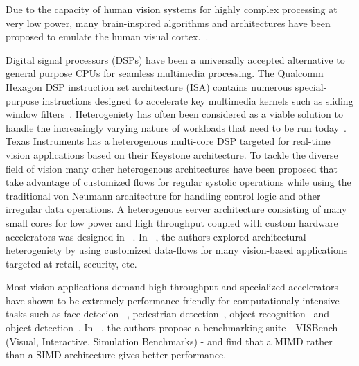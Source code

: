 
Due to the capacity of human vision systems for highly complex processing at very low power, many brain-inspired algorithms and architectures have been proposed to emulate the human visual cortex.~\cite{Nere2011,Chen2014,Kestur2012}. %

Digital signal processors (DSPs) have been a universally accepted alternative to general purpose CPUs for seamless multimedia processing. 
The Qualcomm Hexagon DSP instruction set architecture (ISA) contains numerous special-purpose instructions designed to accelerate key multimedia kernels such as 
sliding window filters~\cite{hexagon}. 
Heterogeniety has often been considered as a viable solution to handle the increasingly varying nature of workloads that need to be run today~\cite{micro2010}.
Texas Instruments has a heterogenous multi-core DSP targeted for real-time vision applications based on their Keystone architecture. 
To tackle the diverse field of vision many other heterogenous architectures have been proposed that take advantage of 
customized flows for regular systolic operations while
using the traditional von Neumann architecture for handling control logic and other irregular data operations. A heterogenous server architecture consisting of 
many small cores for low power and high throughput coupled with custom hardware accelerators was designed in ~\cite{Iyer2011}.
In ~\cite{HPCA2015}, the authors explored architectural heterogeniety by using customized data-flows for many vision-based applications targeted at retail, 
security, etc.

Most vision applications demand high throughput and 
specialized accelerators have shown to be extremely performance-friendly for computationaly intensive tasks such as 
face detecion ~\cite{violafccm}, pedestrian detection~\cite{sips2014}, object recognition~\cite{Maashri2012a} and object detection~\cite{Bae2011}. In ~\cite{micro2008}, the authors propose a benchmarking suite - VISBench (Visual, Interactive, Simulation Benchmarks) - and find that a MIMD rather than a SIMD architecture gives better performance.

